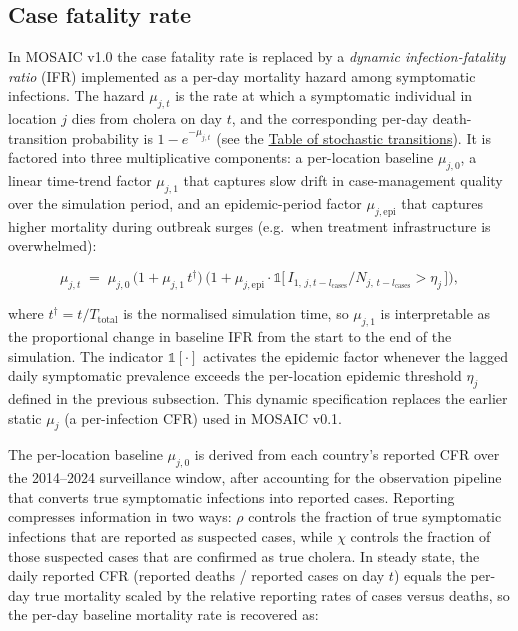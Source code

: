 \documentclass[
]{book}
\begin{document}
\subsection{Case fatality rate}\label{case-fatality-rate}

In MOSAIC v1.0 the case fatality rate is replaced by a \emph{dynamic infection-fatality ratio} (IFR) implemented as a per-day mortality hazard among symptomatic infections. The hazard \(\mu_{j,t}\) is the rate at which a symptomatic individual in location \(j\) dies from cholera on day \(t\), and the corresponding per-day death-transition probability is \(1 - e^{-\mu_{j,t}}\) (see the \hyperref[transitions-table]{Table of stochastic transitions}). It is factored into three multiplicative components: a per-location baseline \(\mu_{j,0}\), a linear time-trend factor \(\mu_{j,1}\) that captures slow drift in case-management quality over the simulation period, and an epidemic-period factor \(\mu_{j,\text{epi}}\) that captures higher mortality during outbreak surges (e.g.~when treatment infrastructure is overwhelmed):

\begin{equation}
\mu_{j,t} \;=\; \mu_{j,0} \,\big(1 + \mu_{j,1}\, t^{\dagger}\big)\,\Big(1 + \mu_{j,\text{epi}} \cdot \mathbb{1}\!\big[\,I_{1,\,j,t - l_{\text{cases}}} \big/ N_{j,\,t - l_{\text{cases}}} > \eta_j\,\big]\Big),
\label{eq:mu-jt}
\end{equation}

where \(t^{\dagger} = t / T_{\text{total}}\) is the normalised simulation time, so \(\mu_{j,1}\) is interpretable as the proportional change in baseline IFR from the start to the end of the simulation. The indicator \(\mathbb{1}[\cdot]\) activates the epidemic factor whenever the lagged daily symptomatic prevalence exceeds the per-location epidemic threshold \(\eta_j\) defined in the previous subsection. This dynamic specification replaces the earlier static \(\mu_j\) (a per-infection CFR) used in MOSAIC v0.1.

The per-location baseline \(\mu_{j,0}\) is derived from each country's reported CFR over the 2014--2024 surveillance window, after accounting for the observation pipeline that converts true symptomatic infections into reported cases. Reporting compresses information in two ways: \(\rho\) controls the fraction of true symptomatic infections that are reported as suspected cases, while \(\chi\) controls the fraction of those suspected cases that are confirmed as true cholera. In steady state, the daily reported CFR (reported deaths / reported cases on day \(t\)) equals the per-day true mortality scaled by the relative reporting rates of cases versus deaths, so the per-day baseline mortality rate is recovered as:
\end{document}
